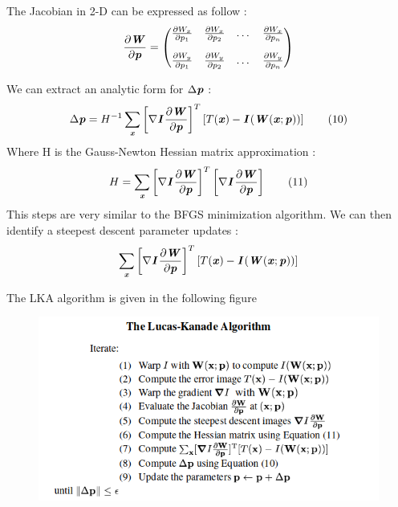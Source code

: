 \documentclass[a4paper,12pt]{report}
\newcommand{\bepar}[1]{
	\left( #1 \right)  
}
\newcommand{\becro}[1]{
	\left[ #1 \right]  
}
\numberwithin{equation}{section} %
\begin{document}
The Jacobian in 2-D can be expressed as follow :
\begin{equation*}
\frac{\partial \textbf{\textit{W}}}{\partial \textbf{\textit{p}}} =
	\begin{pmatrix} 
    	\frac{\partial W_x}{\partial p_1} & \frac{\partial W_x}{\partial p_2} & \dots & 		\frac{\partial W_x}{\partial p_n}\\[4mm]
    	\frac{\partial W_y}{\partial p_1} & \frac{\partial W_y}{\partial p_2} & \dots & 		\frac{\partial W_y}{\partial p_n}\\
    \end{pmatrix}
\end{equation*}

We can extract an analytic form for $\Delta\textbf{\textit{p}}$ :
\begin{equation*}
\Delta\textbf{\textit{p}} = H^{-1} \sum_\textbf{\textit{x}} \becro{\nabla \textit{\textbf{I}}\,\frac{\partial\textbf{\textit{W}}}{\partial \textbf{\textit{p}}}}^T \becro{T(\textbf{\textit{x}}) - \textit{\textbf{I}}\bepar{\textbf{\textit{W}}(\textbf{\textit{x}}; \textbf{\textit{p}})}} \tag{10}
\end{equation*}
Where  H is the Gauss-Newton Hessian matrix approximation :
\begin{equation*}
H = \sum_\textit{\textbf{x}} \becro{\nabla \textit{\textbf{I}}\,\frac{\partial\textbf{\textit{W}}}{\partial \textbf{\textit{p}}}}^T \becro{\nabla \textit{\textbf{I}}\,\frac{\partial\textbf{\textit{W}}}{\partial \textbf{\textit{p}}}} \tag{11}
\end{equation*}
This steps are very similar to the BFGS minimization algorithm. We can then identify a steepest descent parameter updates :
\begin{equation*}
\sum_\textbf{\textit{x}} \becro{\nabla \textit{\textbf{I}}\,\frac{\partial\textbf{\textit{W}}}{\partial \textbf{\textit{p}}}}^T \becro{T(\textbf{\textit{x}}) - \textit{\textbf{I}}\bepar{\textbf{\textit{W}}(\textbf{\textit{x}}; \textbf{\textit{p}})}}
\end{equation*}

The LKA algorithm is given in the following figure 
\begin{figure}[!ht]
\centering
\includegraphics[scale=0.6]{LKA.png}
\caption{}
\label{}
\end{figure}
\newpage
\end{document}
